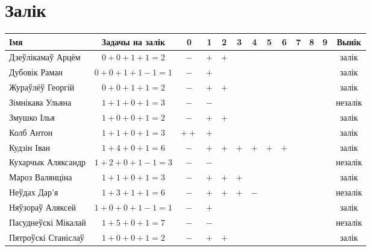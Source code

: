 \documentclass[12pt, a4paper]{extarticle}
\begin{document}
    \section{Залік}
    \begin{table}[H]
        \begin{minipage}{\textwidth}
            \begin{tabular}{|l|c|c|c|c|c|c|c|c|c|c|c|c|}
                \hline
                Імя                 & Задачы на залік &  0  &  1  &  2  &  3  &  4  &  5  &  6  &  7  &  8  &  9  &  Вынік  \\ \hline
                Дзеўлікамаў Арцём   &   $0+0+1+1=2$   & $-$ & $+$ & $+$ &  &  &  &  &  &  &  &  залік \\ \hline
                Дубовік Раман       &  $0+0+1+1-1=1$  & $-$ & $+$ &  &  &  &  &  &  &  &  &  залік\\ \hline
                Жураўлёў Георгій    &   $0+0+1+1=2$   & $-$ & $+$ & $+$ &   &  &  &  &  &  &  & залік \\ \hline
                Зімнікава Ульяна    &   $1+1+0+1=3$   & $-$ & $-$ &  &  &  &  &  &  &  &  &  незалік \\ \hline
                Змушко Ілья         &   $1+0+0+1=2$   & $-$ & $+$ & $+$ &   &  &  &  &  &  &  &  залік \\ \hline
                Колб Антон          &   $1+1+0+1=3$   & $++$ & $+$ &  &  &  &  &  &  &  &  &  залік \\ \hline
                Кудзін Іван         &   $1+4+0+1=6$   & $-$ & $+$ & $+$ & $+$ & $+$ & $+$ & $+$  &   &  &  &  залік \\ \hline
                Кухарчык Аляксандр  &  $1+2+0+1-1=3$  & $-$ & $-$ &  &  &  &  &  &  &  &  &  незалік \\ \hline
                Мароз Валянціна     &   $1+1+0+1=3$   & $-$ & $+$ & $+$ & $+$ &   &  &  &  &  &  &  залік \\ \hline
                Неўдах Дар'я        &   $1+3+1+1=6$   & $-$ & $+$ & $+$ & $+$ & $-$ &   &  &  &  &  &  незалік \\ \hline
                Няўзораў Аляксей    &  $1+0+0+1-1=1$  & $-$ & $+$ &  &  &  &  &  &  &  &  &  залік \\ \hline
                Пасуднеўскі Мікалай &   $1+5+0+1=7$   & $-$ & $-$ &  &  &  &  &  &  &  &  &  незалік \\ \hline
                Пятроўскі Станіслаў &   $1+0+0+1=2$   & $-$ & $+$ & $+$ &   &  &  &  &  &  &  &  залік \\ \hline

\end{tabular}
\end{minipage}
\end{table}
\end{document}
